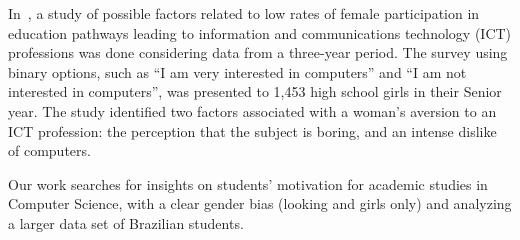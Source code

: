 In~\cite{anderson_because_2008}, a study of possible factors related to low rates of female participation in education pathways leading to information and communications technology (ICT) professions was done considering data from a three-year period. The survey using binary options, such as ``I am very interested in computers'' and ``I am not interested in computers'', was presented to 1,453 high school girls in their Senior year. The study identified two factors associated with a woman's aversion to an ICT profession: the perception that the subject is boring, and an intense dislike of computers.


Our work searches for insights on students' motivation for academic studies in Computer Science, with a clear gender bias (looking and girls only) and analyzing a larger data set of Brazilian students.
